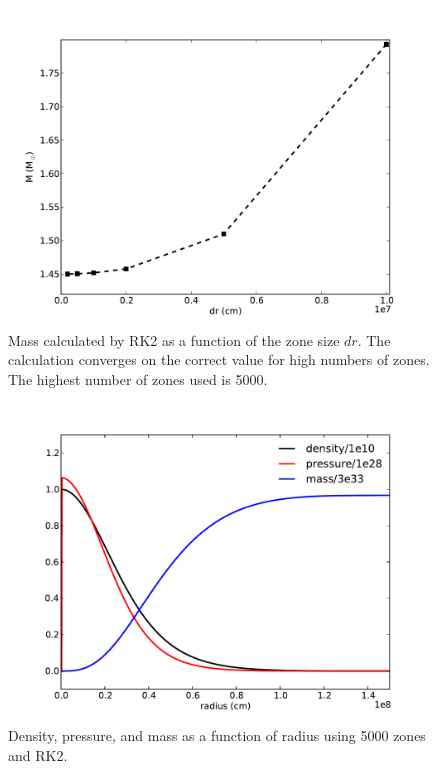 \documentclass[12pt,preprint]{aastex}
\begin{document}
\begin{figure}[!ht]
\begin{center}
\includegraphics[width=5in]{RK2_mass.pdf}
\end{center}
\caption{Mass calculated by RK2 as a function of the zone size $dr$. The calculation converges on the correct value for high numbers of zones. The highest number of zones used is 5000. \label{f:RK2_mass}}
\end{figure}

\begin{figure}[!ht]
\begin{center}
\includegraphics[width=5in]{profiles.pdf}
\end{center}
\caption{Density, pressure, and mass as a function of radius using 5000 zones and RK2. \label{f:profiles}}
\end{figure}
\end{document}
